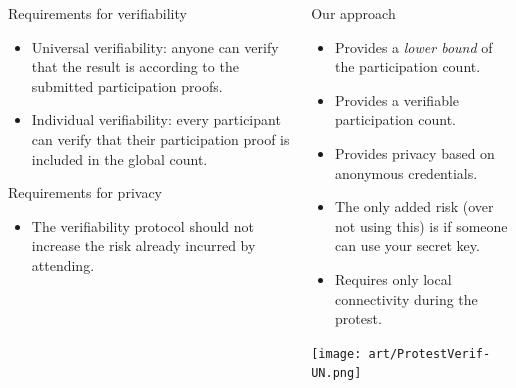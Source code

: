 \begin{columns}[t]
\begin{column}{0.32\linewidth}
\begin{blueblock}{Requirements for verifiability}
\begin{itemize}
        \item\label{UniversalVerif} Universal verifiability: anyone can verify 
          that the result is according to the submitted participation proofs.

        \item\label{IndividualVerif} Individual verifiability: every participant 
          can verify that their participation proof is included in the global 
          count.
      \end{itemize}
    \end{blueblock}

    \begin{blueblock}{Requirements for privacy}
      \begin{itemize}
        \item The verifiability protocol should not increase the risk already 
          incurred by attending.
      \end{itemize}
    \end{blueblock}

  \end{column}

  \begin{column}{0.32\linewidth}

    \begin{greenblock}{Our approach}
      \begin{itemize}
        \item Provides a \emph{lower bound} of the participation count.
        \item Provides a verifiable participation count.
        \item Provides privacy based on anonymous credentials.
        \item The only added risk (over not using this) is if someone can use 
          your secret key.
        \item Requires only local connectivity during the protest.
      \end{itemize}
    \end{greenblock}

    \texttt{[image: art/ProtestVerif-UN.png]}

  \end{column}

\end{columns}

\vspace{5em}

